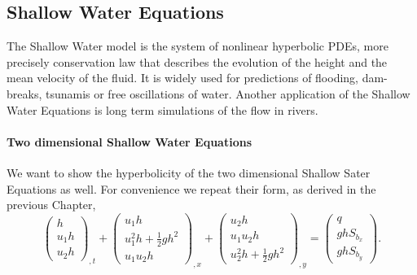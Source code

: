 \documentclass[a4paper,12pt]{article}
\theoremstyle{definition}
\theoremstyle{definition}
\begin{document}
\subsection{Shallow Water Equations}
The Shallow Water model is the system of nonlinear hyperbolic PDEs, more precisely conservation law that describes the evolution of the height and the mean velocity of the fluid. It is widely used for predictions of flooding, dam-breaks, tsunamis or free oscillations of water. Another application of the Shallow Water Equations is long term simulations of the flow in rivers.



\paragraph{Two dimensional Shallow Water Equations}\label{ch:modelSWE2}
We want to show the hyperbolicity of the two dimensional Shallow Sater Equations as well. For convenience we repeat their form, as derived in the previous Chapter,
\begin{equation}\label{eq:swe2D:repeat}
\begin{pmatrix}
h\\
u_1h\\
u_2h
\end{pmatrix}_{,t} +
\begin{pmatrix}
u_1h\\
u_1^2h + \frac{1}{2}gh^2\\
u_1u_2h
\end{pmatrix}_{,x} +
\begin{pmatrix}
u_2h\\
u_1u_2h\\
u_2^2h + \frac{1}{2}gh^2
\end{pmatrix}_{,y} =
\begin{pmatrix}
q\\
ghS_{b_x}\\
ghS_{b_y}
\end{pmatrix}.
\end{equation}
\end{document}
